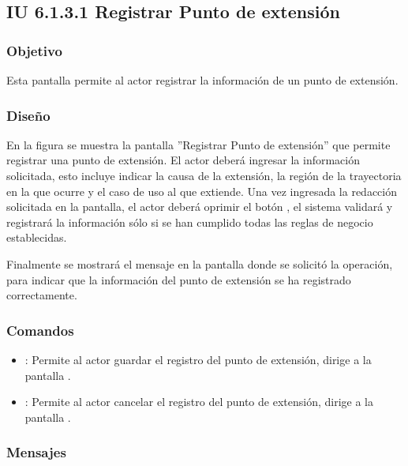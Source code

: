 \subsection{IU 6.1.3.1 Registrar Punto de extensión}

\subsubsection{Objetivo}
	Esta pantalla permite al actor registrar la información de un punto de extensión.
\subsubsection{Diseño}
	En la figura  se muestra la pantalla ''Registrar Punto de extensión'' que permite registrar una punto de extensión. El actor deberá ingresar la información solicitada, esto incluye indicar la causa de la extensión, la región de la trayectoria en la que ocurre y el caso de uso al que extiende.
	Una vez ingresada la redacción solicitada en la pantalla, el actor deberá oprimir el botón , el sistema validará y registrará la información sólo si se han cumplido todas las reglas de negocio establecidas.
	
	Finalmente se mostrará el mensaje  en la pantalla donde se solicitó la operación, para indicar que la información del punto de extensión se ha registrado correctamente.

\subsubsection{Comandos}
\begin{itemize}
	\item {}: Permite al actor guardar el registro del punto de extensión, dirige a la pantalla .
	\item {}: Permite al actor cancelar el registro del punto de extensión, dirige a la pantalla .
\end{itemize}

\subsubsection{Mensajes}

